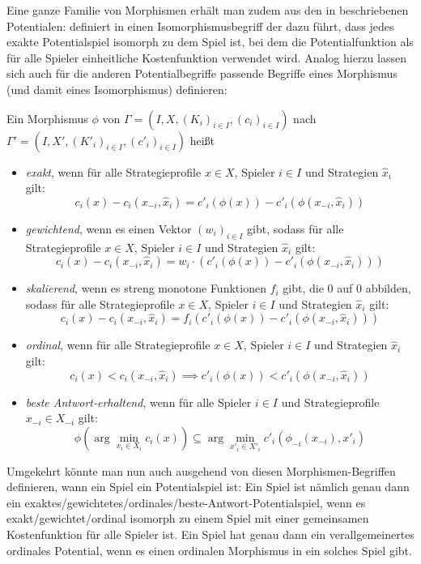 Eine ganze Familie von Morphismen erhält man zudem aus den in  beschriebenen Potentialen: \citeauthor{ReprOfFiniteGamesAsNCG} definiert in \cite{ReprOfFiniteGamesAsNCG} einen Isomorphismusbegriff der dazu führt, dass jedes exakte Potentialspiel isomorph zu dem Spiel ist, bei dem die Potentialfunktion als für alle Spieler einheitliche Kostenfunktion verwendet wird. Analog hierzu lassen sich auch für die anderen Potentialbegriffe passende Begriffe eines Morphismus (und damit eines Isomorphismus) definieren:

\begin{defn}\label{def:PotentialMorphismen}
	Ein Morphismus $\phi$ von $\Gamma = (I, X, (K_i)_{i\in I}, (c_i)_{i\in I})$ nach $\Gamma' = (I, X', (K'_i)_{i\in I}, (c'_i)_{i\in I})$ heißt
	\begin{itemize}
		\item \emph{exakt}, wenn für alle Strategieprofile $x \in X$, Spieler $i \in I$ und Strategien $\hat{x}_i$ gilt:
			\[c_i(x) - c_i(x_{-i}, \hat{x}_i) = c'_i(\phi(x)) - c'_i(\phi(x_{-i}, \hat{x}_i))\]
		\item \emph{gewichtend}, wenn es einen Vektor $(w_i)_{i \in I}$ gibt, sodass für alle Strategieprofile $x \in X$, Spieler $i \in I$ und Strategien $\hat{x}_i$ gilt:
			\[c_i(x) - c_i(x_{-i}, \hat{x}_i) = w_i\cdot\left(c'_i(\phi(x)) - c'_i(\phi(x_{-i}, \hat{x}_i))\right)\]
		\item \emph{skalierend}, wenn es streng monotone Funktionen $f_i$ gibt, die $0$ auf $0$ abbilden, sodass für alle Strategieprofile $x \in X$, Spieler $i \in I$ und Strategien $\hat{x}_i$ gilt:
			\[c_i(x) - c_i(x_{-i}, \hat{x}_i) = f_i(c'_i(\phi(x)) - c'_i(\phi(x_{-i}, \hat{x}_i)))\]
		\item \emph{ordinal}, wenn für alle Strategieprofile $x \in X$, Spieler $i \in I$ und Strategien $\hat{x}_i$ gilt:
			\[c_i(x) < c_i(x_{-i}, \hat{x}_i) \implies c'_i(\phi(x)) < c'_i(\phi(x_{-i}, \hat{x}_i))\]
		\item \emph{beste Antwort-erhaltend}, wenn für alle Spieler $i \in I$ und Strategieprofile $x_{-i} \in X_{-i}$ gilt:
			\[\phi(\arg \min_{x_i \in X_i}c_i(x)) \subseteq \arg \min_{x'_i \in X'_i} c'_i(\phi_{-i}(x_{-i}), x'_i)\]
	\end{itemize}	
\end{defn}

\begin{bem}
	Umgekehrt könnte man nun auch ausgehend von diesen Morphismen-Begriffen definieren, wann ein Spiel ein Potentialspiel ist: Ein Spiel ist nämlich genau dann ein exaktes/gewichtetes/ordinales/beste-Antwort-Potentialspiel, wenn es exakt/gewichtet/ordinal isomorph zu einem Spiel mit einer gemeinsamen Kostenfunktion für alle Spieler ist. Ein Spiel hat genau dann ein verallgemeinertes ordinales Potential, wenn es einen ordinalen Morphismus in ein solches Spiel gibt.
\end{bem}

